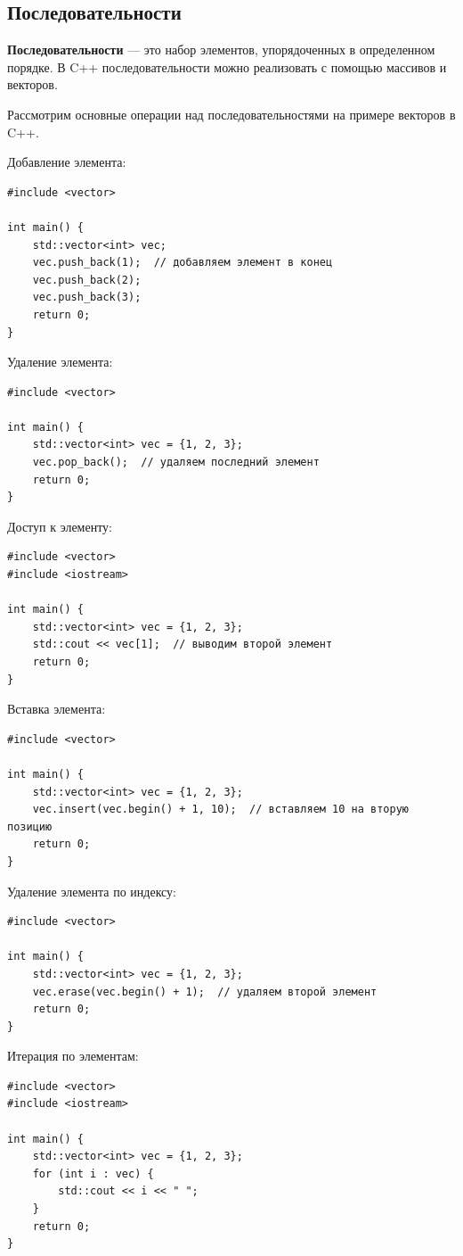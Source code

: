 \subsection{Последовательности}

\textbf{Последовательности} — это набор элементов, упорядоченных в определенном порядке. В C++ последовательности можно реализовать с помощью массивов и векторов.

Рассмотрим основные операции над последовательностями на примере векторов в C++.

Добавление элемента:
\begin{verbatim}
#include <vector>

int main() {
    std::vector<int> vec;
    vec.push_back(1);  // добавляем элемент в конец
    vec.push_back(2);
    vec.push_back(3);
    return 0;
}
\end{verbatim}

Удаление элемента:
\begin{verbatim}
#include <vector>

int main() {
    std::vector<int> vec = {1, 2, 3};
    vec.pop_back();  // удаляем последний элемент
    return 0;
}
\end{verbatim}

Доступ к элементу:
\begin{verbatim}
#include <vector>
#include <iostream>

int main() {
    std::vector<int> vec = {1, 2, 3};
    std::cout << vec[1];  // выводим второй элемент
    return 0;
}
\end{verbatim}

Вставка элемента:
\begin{verbatim}
#include <vector>

int main() {
    std::vector<int> vec = {1, 2, 3};
    vec.insert(vec.begin() + 1, 10);  // вставляем 10 на вторую позицию
    return 0;
}
\end{verbatim}

Удаление элемента по индексу:
\begin{verbatim}
#include <vector>

int main() {
    std::vector<int> vec = {1, 2, 3};
    vec.erase(vec.begin() + 1);  // удаляем второй элемент
    return 0;
}
\end{verbatim}

Итерация по элементам:
\begin{verbatim}
#include <vector>
#include <iostream>

int main() {
    std::vector<int> vec = {1, 2, 3};
    for (int i : vec) {
        std::cout << i << " ";
    }
    return 0;
}
\end{verbatim}


